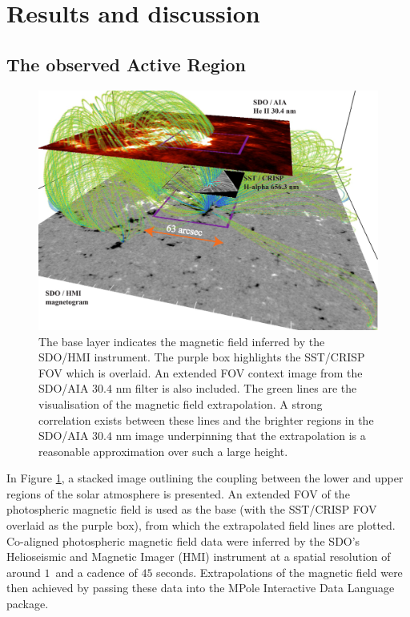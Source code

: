 \section{Results and discussion}
\label{sect2}

\subsection{The observed Active Region}

	\begin{figure}
		\centering
		\includegraphics[width=\textwidth]{full_overview.pdf}
		\caption
		{
		The base layer indicates the magnetic field inferred by the SDO/HMI instrument.
		The purple box highlights the SST/CRISP FOV which is overlaid.
		An extended FOV context image from the SDO/AIA $30.4$ nm filter is also included.
		The green lines are the visualisation of the magnetic field extrapolation.
		A strong correlation exists between these lines and the brighter regions in the SDO/AIA $30.4$ nm image underpinning that the extrapolation is a reasonable approximation over such a large height.
		}
		\label{mag_field}
	\end{figure}

	In Figure \ref{mag_field}, a stacked image outlining the coupling between the lower and upper regions of the solar atmosphere is presented.
	An extended FOV of the photospheric magnetic field is used as the base (with the SST/CRISP FOV overlaid as the purple box), from which the extrapolated field lines are plotted.
	Co-aligned photospheric magnetic field data were inferred by the SDO's Helioseismic and Magnetic Imager (HMI) instrument at a spatial resolution of around $1$\arcsecs\ and a cadence of $45$ seconds.
	Extrapolations of the magnetic field were then achieved by passing these data into the MPole Interactive Data Language package\citep{Longcope1996,Longcope2002}.

